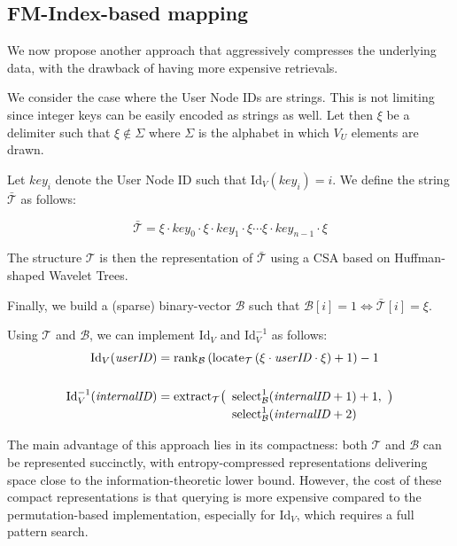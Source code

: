 \subsection{FM-Index-based mapping}\label{sec:FMIdxMapping}

We now propose another approach that aggressively compresses the underlying data, with the drawback of having more expensive retrievals.

We consider the case where the User Node IDs are strings. This is not limiting since integer keys can be easily encoded as strings as well. Let then $\xi$ be a delimiter such that $\xi \not \in \Sigma$  where $\Sigma$ is the alphabet in which $V_U$ elements are drawn.

Let \(key_i\) denote the User Node ID such that \(\mathrm{Id}_V(key_i) = i\). We define the string \(\bar{\mathcal{T}}\) as follows:

\[
\bar{\mathcal{T}} = \xi \cdot key_0 \cdot \xi \cdot key_1 \cdot \xi \cdots \xi \cdot key_{n - 1} \cdot \xi
\]

The structure \(\mathcal{T}\) is then the representation of \(\bar{\mathcal{T}}\) using a CSA based on Huffman-shaped Wavelet Trees.

Finally, we build a (sparse) binary-vector $\mathcal B$ such that $\mathcal B[i] = 1 \iff \bar{\mathcal{T}} [i] = \xi$.

Using $\mathcal{T}$ and $\mathcal{B}$, we can implement $\mathrm{Id}_V$ and $\mathrm{Id}_V^{-1}$ as follows:
\begin{align*}
  \mathrm{Id}_V(\mathit{userID})
    &= \operatorname{rank}_{\mathcal{B}}\left(
          \operatorname{locate}_{\mathcal{T}} \left(
            \xi \cdot \mathit{userID} \cdot \xi
          \right) + 1
        \right) - 1 \\
\\
  \mathrm{Id}_V^{-1}(\mathit{internalID})
    &= \operatorname{extract}_{\mathcal{T}} \bigl(
        \begin{array}[t]{l}
          \operatorname{select}^1_{\mathcal{B}}(\mathit{internalID} + 1) + 1, \\[0.2em]
          \operatorname{select}^1_{\mathcal{B}}(\mathit{internalID} + 2)
        \end{array}
      \bigr)
\end{align*}


The main advantage of this approach lies in its compactness: both $\mathcal{T}$ and $\mathcal{B}$ can be represented succinctly, with entropy-compressed representations delivering space close to the information-theoretic lower bound. However, the cost of these compact representations is that querying is more expensive compared to the permutation-based implementation, especially for $\mathrm{Id}_V$, which requires a full pattern search.

